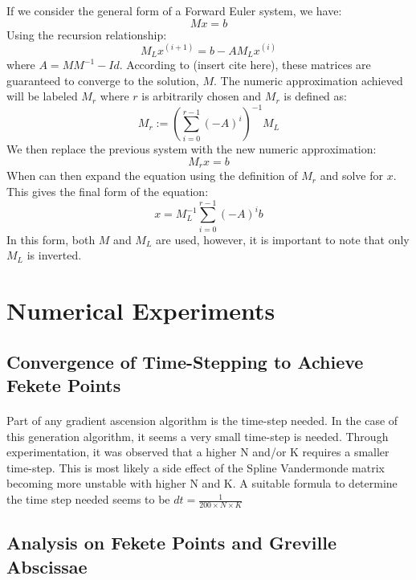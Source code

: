 \documentclass{article}
\begin{document}
\noindent If we consider the general form of a Forward Euler system, we have:
\begin{equation*}
Mx=b
\end{equation*}
Using the recursion relationship:
\begin{equation*}
M_Lx^{(i+1)}=b-AM_Lx^{(i)}
\end{equation*}
where $A=MM^{-1}-Id$. According to (insert cite here), these matrices are guaranteed
to converge to the solution, $M$. The numeric approximation achieved will be labeled $M_r$ where $r$ is arbitrarily chosen and $M_r$ is defined as:
\begin{equation*}
M_r:=\left( \sum _{i=0}^{r-1}(-A)^{i}\right) ^{-1} M_L
\end{equation*}
We then replace the previous system with the new numeric approximation:
\begin{equation*}
M_rx=b
\end{equation*}
When can then expand the equation using the definition of $M_r$ and solve for $x$. This gives the final form of the equation:
\begin{equation*}
x=M_L^{-1}\sum _{i=0}^{r-1}(-A)^{i}b
\end{equation*}
In this form, both $M$ and $M_L$ are used, however, it is important to note that only $M_L$ is inverted. 

\section*{Numerical Experiments}
\subsection*{Convergence of Time-Stepping to Achieve Fekete Points}
\paragraph{}
Part of any gradient ascension algorithm is the time-step needed. In the case of this generation algorithm, it seems a very small time-step is needed. Through experimentation, it was observed that a higher N and/or K requires a smaller time-step. This is most likely a side effect of the Spline Vandermonde matrix becoming more unstable with higher N and K. A suitable formula to determine the time step needed seems to be $dt = \frac{1}{200\times N\times K}$

\subsection*{Analysis on Fekete Points and Greville Abscissae}
\end{document}
